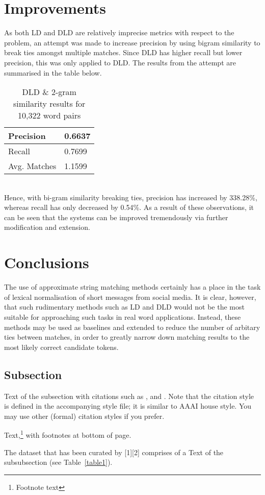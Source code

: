 \documentclass[11pt]{article}
\begin{document}
\section{Improvements}
As both LD and DLD are relatively imprecise metrics with respect to the problem, an attempt was made to increase precision by using bigram similarity to break ties amongst multiple matches. Since DLD has higher recall but lower precision, this was only applied to DLD. The results from the attempt are summarised in the table below.
\\
\begin{table}[h]
\begin{center}
\begin{tabular}{|l|l|}
      \hline
      Precision & 0.6637\\
      \hline
      Recall & 0.7699\\
      \hline
      Avg. Matches & 1.1599\\
      \hline
\end{tabular}
\caption{DLD \& 2-gram similarity results for 10,322 word pairs}\label{table2}
\end{center}
\end{table}
\\
Hence, with bi-gram similarity breaking ties, precision has increased by 338.28\%, whereas recall has only decreased by 0.54\%. As a result of these observations, it can be seen that the systems can be improved tremendously via further modification and extension.



\section{Conclusions}
The use of approximate string matching methods certainly has a place in the task of lexical normalisation of short messages from social media. It is clear, however, that such rudimentary methods such as LD and DLD would not be the most suitable for approaching such tasks in real word applications. Instead, these methods may be used as baselines and extended to reduce the number of arbitary ties between matches, in order to greatly narrow down matching results to the most likely correct candidate tokens. 



\subsection{Subsection}

Text of the subsection with citations such as 
,  and .
Note that the citation style is defined in the accompanying
style file; it is similar to AAAI house style. You may use
other (formal) citation styles if you prefer.


Text,\footnote{Footnote text} with footnotes at bottom of page.


The dataset that has been curated by [1][2] comprises of a 
Text of the subsubsection (see Table~\ref{table1}).






\end{document}
